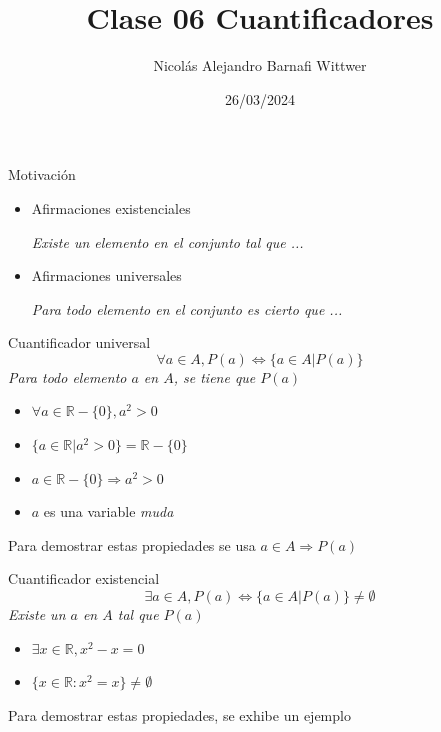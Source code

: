\documentclass[14pt,aspectratio=169,xcolor=dvipsnames]{beamer}
\title[short title]{Clase 06 Cuantificadores}
\subtitle{}
\author[NA Barnafi] {Nicolás Alejandro Barnafi Wittwer}
\institute[UC|CMM] 
{
    Pontificia Universidad Católica de Chile \\
    Centro de Modelamiento Matemático
}
\date{26/03/2024}
\newcommand{\R}{\mathbb{R}}
\begin{document}
\begin{frame}
    \maketitle
\end{frame}
\begin{frame}{Motivación}
    \begin{itemize}
        \item Afirmaciones existenciales 
            \begin{flushright}
                \emph{Existe un elemento en el conjunto tal que ...}
            \end{flushright}
        \item Afirmaciones universales
            \begin{flushright}
                \emph{Para todo elemento en el conjunto es cierto que ...}
            \end{flushright}
    \end{itemize}
    \vspace{1cm}
\end{frame}
\begin{frame}{Cuantificador universal}
    $$ \forall a \in A, P(a) \Leftrightarrow \{a \in A|P(a)\} $$
    \emph{Para todo elemento $a$ en $A$, se tiene que $P(a)$}
    \pause
    \begin{itemize}
        \item $\forall a \in \mathbb R - \{0\}, a^2>0$
        \item $\{a\in \mathbb R | a^2 > 0 \} = \mathbb R - \{0\}$
        \item $a\in \mathbb R - \{0\} \Rightarrow a^2>0$
        \item $a$ es una variable \emph{muda}
    \end{itemize}
    \alert{Para demostrar estas propiedades se usa $a\in A\Rightarrow P(a)$}
\end{frame}
\begin{frame}{Cuantificador existencial}
    $$ \exists a \in A, P(a) \Leftrightarrow \{ a \in A | P(a) \} \neq \emptyset $$
    \emph{Existe un $a$ en $A$ tal que $P(a)$}
    \pause
    \begin{itemize}
        \item $\exists x \in \R, x^2-x=0$
        \item $\{x\in \R: x^2 = x\} \neq \emptyset$
    \end{itemize}
    \alert{Para demostrar estas propiedades, se exhibe un ejemplo}
\end{frame}
\end{document}
